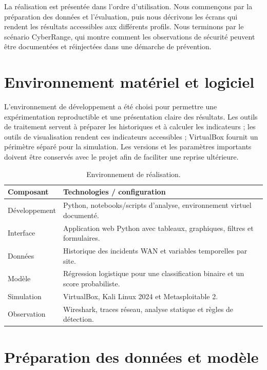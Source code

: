 \documentclass[12pt,a4paper,oneside]{report}
\begin{document}
La réalisation est présentée dans l’ordre d’utilisation. Nous commençons par la préparation des données et l’évaluation, puis nous décrivons les écrans qui rendent les résultats accessibles aux différents profils. Nous terminons par le scénario CyberRange, qui montre comment les observations de sécurité peuvent être documentées et réinjectées dans une démarche de prévention.

\section{Environnement matériel et logiciel}

L’environnement de développement a été choisi pour permettre une expérimentation reproductible et une présentation claire des résultats. Les outils de traitement servent à préparer les historiques et à calculer les indicateurs ; les outils de visualisation rendent ces indicateurs accessibles ; VirtualBox fournit un périmètre séparé pour la simulation. Les versions et les paramètres importants doivent être conservés avec le projet afin de faciliter une reprise ultérieure.

\begin{table}[H]
\centering
\small
\caption{Environnement de réalisation.}
\begin{tabularx}{\textwidth}{B{4.0cm} X}
\toprule
Composant & Technologies / configuration\\
\midrule
Développement & Python, notebooks/scripts d’analyse, environnement virtuel documenté.\\
Interface & Application web Python avec tableaux, graphiques, filtres et formulaires.\\
Données & Historique des incidents WAN et variables temporelles par site.\\
Modèle & Régression logistique pour une classification binaire et un score probabiliste.\\
Simulation & VirtualBox, Kali Linux 2024 et Metasploitable 2.\\
Observation & Wireshark, traces réseau, analyse statique et règles de détection.\\
\bottomrule
\end{tabularx}
\end{table}

\section{Préparation des données et modèle}
\end{document}
